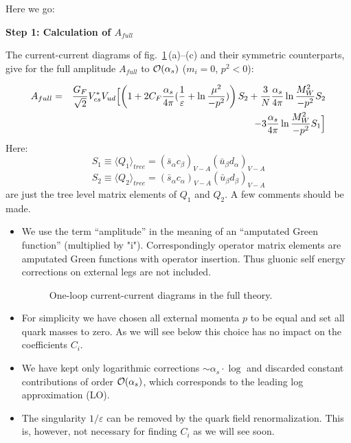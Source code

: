 \documentclass[12pt]{article}
\def\eps{\varepsilon}
\def\as{\alpha_s}
\newcommand{\ord}{{\cal O}}
\def\aspi{\frac{\as}{4\pi}}
\begin{document}
\begin{itemize}
\begin{itemize}
\begin{itemize}
Here we go:

{\bf Step 1: Calculation of $A_{full}$}

The current-current diagrams of fig.~\ref{L:13}\,(a)--(c) and their
symmetric counterparts,
give for the full amplitude $A_{full}$ to $\ord(\as)$ ($m_i=0$, $p^2<0$):

\begin{eqnarray}\label{amp}
A_{full}
&=&
{G_F\over\sqrt{2}}V^\ast_{cs}V_{ud}
\Bigl[ \left( 1+2C_F \aspi (\frac{1}{\varepsilon}+\ln{\mu^2\over -p^2}) \right)
S_2 +{3\over N}\aspi\ln{M^2_W\over -p^2} S_2
\nonumber\\
& &
-3\aspi\ln{M^2_W\over -p^2} S_1 \Bigr] 
\end{eqnarray}
Here:
\begin{equation}\label{s1c} 
S_1\equiv \langle Q_1\rangle_{tree}=
(\bar s_\alpha c_\beta)_{V-A}(\bar u_\beta d_\alpha)_{V-A}
\end{equation}
\begin{equation}\label{s2c} 
S_2\equiv \langle Q_2\rangle_{tree}=
(\bar s_\alpha c_\alpha)_{V-A}(\bar u_\beta d_\beta)_{V-A}
\end{equation}
are just the tree level matrix elements of $Q_1$ and $Q_2$. A few comments
should be made.
\begin{itemize}
\item
We use the term ``amplitude'' in the meaning of an ``amputated Green
function'' (multiplied by "i"). 
Correspondingly operator matrix elements are
amputated Green functions with operator
insertion. Thus gluonic self energy
corrections on external legs are not included.
\begin{figure}[hbt]
\vspace{0.10in}
\centerline{
\epsfysize=1.25in
}%
\vspace{0.08in}
\caption[]{One-loop current-current 
diagrams in the full theory.
\label{L:13}}
\end{figure}
\item
For simplicity we have chosen all external momenta $p$ to be equal
and set all quark masses to zero. As we will see below this choice
has no impact on the coefficients $C_i$.
\item
We have kept only logarithmic corrections
$\sim\as\cdot\log$ and discarded constant contributions of order
$\ord(\as)$, which corresponds to the leading log approximation (LO).
\item
The singularity $1/\eps$ can be removed by the quark field renormalization.
This is, however, not necessary for finding $C_i$ as we will see soon.
\end{itemize}


\end{itemize}
\end{itemize}
\end{itemize}
\end{document}
